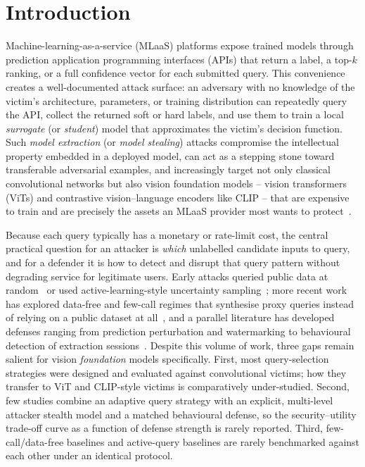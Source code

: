 \documentclass[journal,10pt]{IEEEtran}
\begin{document}
\section{Introduction}
\label{sec:intro}

Machine-learning-as-a-service (MLaaS) platforms expose trained models through prediction
application programming interfaces (APIs) that return a label, a top-$k$ ranking, or a full
confidence vector for each submitted query. This convenience creates a well-documented attack
surface: an adversary with no knowledge of the victim's architecture, parameters, or training
distribution can repeatedly query the API, collect the returned soft or hard labels, and use them
to train a local \emph{surrogate} (or \emph{student}) model that approximates the victim's
decision function. Such \emph{model extraction} (or \emph{model stealing}) attacks compromise the
intellectual property embedded in a deployed model, can act as a stepping stone toward
transferable adversarial examples, and increasingly target not only classical convolutional
networks but also vision foundation models -- vision transformers (ViTs) and contrastive
vision--language encoders like CLIP -- that are expensive to train and are precisely the assets
an MLaaS provider most wants to protect~\cite{dosovitskiy2021vit,radford2021clip}.

Because each query typically has a monetary or rate-limit cost, the central practical question for
an attacker is \emph{which} unlabelled candidate inputs to query, and for a defender it is how to
detect and disrupt that query pattern without degrading service for legitimate users. Early attacks
queried public data at random~\cite{orekondy2019knockoff-context} or used active-learning-style
uncertainty sampling~\cite{pal2020activethief-context}; more recent work has explored data-free
and few-call regimes that synthesise proxy queries instead of relying on a public dataset at
all~\cite{truong2021dfme,kariyappa2021maze,sanyal2022hardlabel,hondru2025aspkd,zhuang2025stealix},
and a parallel literature has developed defenses ranging from prediction perturbation and
watermarking to behavioural detection of extraction
sessions~\cite{jia2021entangled,szyller2021dawn,tang2024modelguard,zhou2024inversionguided}.
Despite this volume of work, three gaps remain salient for vision \emph{foundation} models
specifically. First, most query-selection strategies were designed and evaluated against
convolutional victims; how they transfer to ViT and CLIP-style victims is comparatively
under-studied. Second, few studies combine an adaptive query strategy with an explicit,
multi-level attacker stealth model and a matched behavioural defense, so the security--utility
trade-off curve as a function of defense strength is rarely reported. Third, few-call/data-free
baselines and active-query baselines are rarely benchmarked against each other under an identical
protocol.
\end{document}
